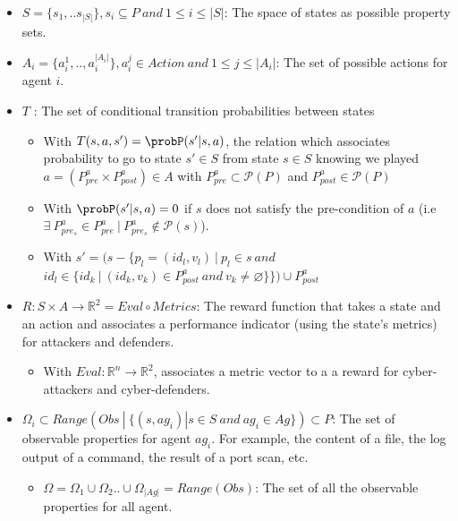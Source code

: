 \begin{itemize}
    \item $S = \{s_1, ..s_{|S|}\}, s_{i} \subseteq P \: and \: 1 \le i \le |S|$: The space of states as possible property sets.

    \item $A_{i} = \{a_{i}^{1},..,a_{i}^{|A_{i}|}\}, a_{i}^j \in Action \: and \: 1 \le j \le |A_i|$: The set of possible actions for agent $i$.

    \item $T$ : The set of conditional transition probabilities between states
    \begin{itemize}
        \item With $T(s,a,s') = \probP(s'|s,a)$, the relation which associates probability to go to state $s' \in S$ from state $s \in S$ knowing we played $a = (P^a_{pre} \times P^a_{post}) \in A$ with $P^a_{pre} \subset \mathcal{P}(P)$ and $P^a_{post} \in \mathcal{P}(P)$
        \item With $\probP(s'|s,a) = 0$ if $s$ does not satisfy the pre-condition of $a$ (i.e $\exists \: P_{pre_s}^{a} \in P_{pre}^{a} \: | \: P_{pre_s}^{a} \not\in \mathcal{P}(s)$).
        \item With $s' = (s - \{p_l=(id_l, v_l) \: | \: p_l \in s \: and$ $id_l \in \{id_k \: | \: (id_k, v_k) \in P^a_{post} \: and \: v_k \neq \varnothing\}\}) \cup P^a_{post}$
    \end{itemize}
    
    \item $R: S \times A \rightarrow \mathbb{R}^2 = Eval \circ Metrics$: The reward function that takes a state and an action and associates a performance indicator (using the state's metrics) for attackers and defenders.
    \begin{itemize}
        \item With $Eval: \mathbb{R}^{n} \rightarrow \mathbb{R}^2$, associates a metric vector to a a reward for cyber-attackers and cyber-defenders.
    \end{itemize}
    
    \item $\Omega_{i} \subset Range(Obs \: | \: \{ (s, ag_i) | s \in S \: and \: ag_i \in Ag \}) \subset P$: The set of observable properties for agent $ag_i$. For example, the content of a file, the log output of a command, the result of a port scan, etc.
    \begin{itemize}
        \item $\Omega = \Omega_1 \cup \Omega_2 .. \cup \Omega_{|Ag|} = Range(Obs)$: The set of all the observable properties for all agent.
    \end{itemize}


\end{itemize}
